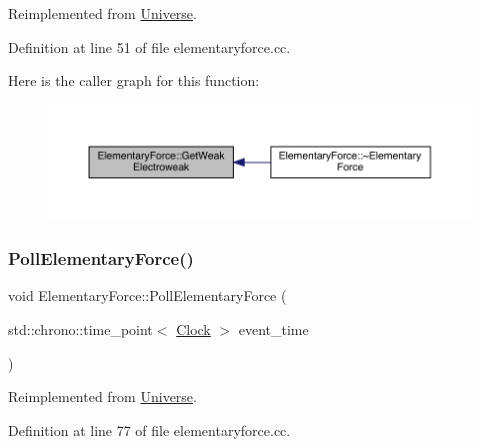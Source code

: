 Reimplemented from \hyperlink{class_universe_a645299738e6b798a037f2a15a2e7cf4d}{Universe}.



Definition at line 51 of file elementaryforce.\+cc.

Here is the caller graph for this function\+:
\nopagebreak
\begin{figure}[H]
\begin{center}
\leavevmode
\includegraphics[width=350pt]{class_elementary_force_a928e06a1fa81b8d7ec4a426d959a0f98_icgraph}
\end{center}
\end{figure}
\mbox{\label{class_elementary_force_aa5ab479744dbf3e8578f8d2974299ff7}} 
\subsubsection{\texorpdfstring{Poll\+Elementary\+Force()}{PollElementaryForce()}}
{\footnotesize\ttfamily void Elementary\+Force\+::\+Poll\+Elementary\+Force (\begin{DoxyParamCaption}\item[{std\+::chrono\+::time\+\_\+point$<$ \hyperlink{universe_8h_a0ef8d951d1ca5ab3cfaf7ab4c7a6fd80}{Clock} $>$}]{event\+\_\+time }\end{DoxyParamCaption})\hspace{0.3cm}{\ttfamily [virtual]}}



Reimplemented from \hyperlink{class_universe_a0c485c504542409cbb5cfd8543c35b11}{Universe}.



Definition at line 77 of file elementaryforce.\+cc.


